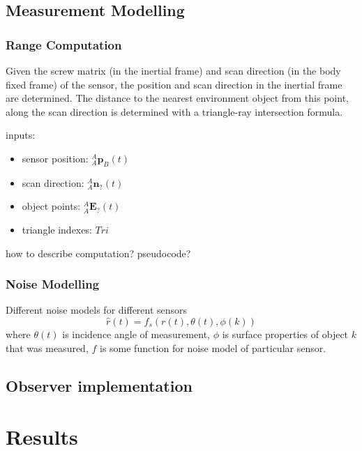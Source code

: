 \subsection{Measurement Modelling}
	\subsubsection{Range Computation}
	Given the screw matrix (in the inertial frame) and scan direction (in the body fixed frame) of the sensor, the position and scan direction in the inertial frame are determined.
	The distance to the nearest environment object from this point, along the scan direction is determined with a triangle-ray intersection formula.
	
	inputs:
	\begin{itemize}
	\item sensor position: ${^{A}_{A}\mathbf{p}^{}_{B}}(t)$
	\item scan direction: ${^{A}_{A}\mathbf{n}^{}_{?}}(t)$
	\item object points: ${^{A}_{A}\mathbf{E}^{}_{?}}(t)$
	\item triangle indexes:	$Tri$
	\end{itemize}
	
	how to describe computation? pseudocode?\\
	
	
	
	\subsubsection{Noise Modelling}
	Different noise models for different sensors
	\begin{equation}
		\hat{r}(t) = f_s(r(t),\theta(t),\phi(k))
	\end{equation}
	where $\theta(t)$ is incidence angle of measurement, $\phi$ is surface properties of object $k$ that was measured, $f$ is some function for noise model of particular sensor.
	
\subsection{Observer implementation}
\section{Results}